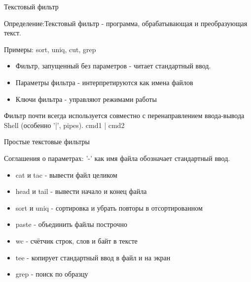 \begin{frame}{Текстовый фильтр}

  Определение:\newline \alert{Текстовый фильтр} - программа, обрабатывающая и преобразующая текст. \newline

  Примеры: \alert{sort}, \alert{uniq}, \alert{cut}, \alert{grep} \pause
  \begin{itemize}
    \item Фильтр, запущенный без параметров - читает стандартный ввод.
    \item Параметры фильтра - интерпретируются как имена файлов
    \item Ключи фильтра - управляют режимами работы
  \end{itemize} \pause

  Фильтр почти всегда используется совместно с перенаправлением ввода-вывода Shell (особенно '|', pipes). cmd1 | cmd2

\end{frame}

\begin{frame}{Простые текстовые фильтры}

  Соглашения о параметрах: \alert{'-'} как имя файла обозначает стандартный ввод.

  \begin{itemize}
    \item \alert{cat} и \alert{tac} - вывести файл целиком \pause
    \item \alert{head} и \alert{tail} - вывести начало и конец файла \pause
    \item \alert{sort} и \alert{uniq} - сортировка и убрать повторы в отсортированном \pause
    \item \alert{paste} - объединить файлы построчно \pause
    \item \alert{wc} - счётчик строк, слов и байт в тексте \pause
    \item \alert{tee} - копирует стандартный ввод в файл и на экран
    \item \alert{grep} - поиск по образцу \pause

  \end{itemize}
\end{frame}

%

